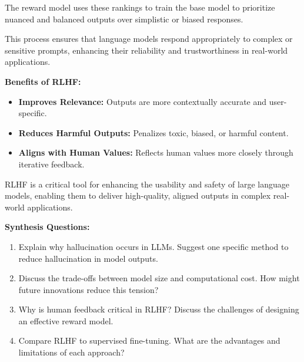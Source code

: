 \begin{flushleft}
The reward model uses these rankings to train the base model to prioritize nuanced and balanced outputs over simplistic or biased responses.

This process ensures that language models respond appropriately to complex or sensitive prompts, enhancing their reliability and trustworthiness in real-world applications. \break

\textbf{Benefits of RLHF:}
\begin{itemize}
    \item \textbf{Improves Relevance:} Outputs are more contextually accurate and user-specific.
    \item \textbf{Reduces Harmful Outputs:} Penalizes toxic, biased, or harmful content.
    \item \textbf{Aligns with Human Values:} Reflects human values more closely through iterative feedback.
\end{itemize}

RLHF is a critical tool for enhancing the usability and safety of large language models, enabling them to deliver high-quality, aligned outputs in complex real-world applications.
\end{flushleft}



\begin{questionbox}
\textbf{Synthesis Questions:}

\begin{enumerate}
    \item Explain why hallucination occurs in LLMs. Suggest one specific method to reduce hallucination in model outputs.
    \item Discuss the trade-offs between model size and computational cost. How might future innovations reduce this tension?
    \item Why is human feedback critical in RLHF? Discuss the challenges of designing an effective reward model.
    \item Compare RLHF to supervised fine-tuning. What are the advantages and limitations of each approach?
\end{enumerate}
\end{questionbox}

